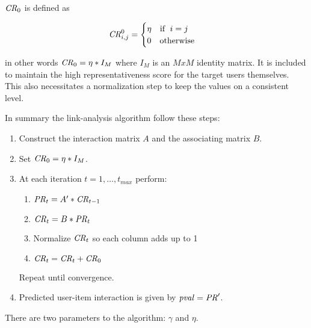$\mathit{CR}_0$ is defined as

\begin{equation}
    \mathit{CR}_{i, j}^0 = \begin{cases}
        \eta \quad \text{if } \; i = j \\
        0    \quad \text{otherwise}
    \end{cases}
\end{equation}

in other words $\mathit{CR}_0 = \eta * I_M$ where $I_M$ is an $M x M$ identity matrix.
It is included to maintain the high representativeness score for the target users themselves. This also necessitates a normalization step to keep the values on a consistent level.

In summary the link-analysis algorithm follow these steps:

\begin{enumerate}
    \item Construct the interaction matrix $A$ and the associating matrix $B$.

    \item Set $\mathit{CR}_0 = \eta * I_M$.
    \item At each iteration $t = 1, \ldots, t_{max}$ perform:

        \begin{enumerate}
            \item $\mathit{PR}_t = A' * \mathit{CR}_{t- 1}$
            \item $\mathit{CR}_t = B * \mathit{PR}_t$
            \item Normalize $\mathit{CR}_t$ so each column adds up to 1
            \item $\mathit{CR}_t = \mathit{CR}_t + \mathit{CR}_0$
        \end{enumerate}

        Repeat until convergence.

    \item Predicted user-item interaction is given by $\mathit{pval} = \mathit{PR}'$.

\end{enumerate}

There are two parameters to the algorithm: $\gamma$ and $\eta$.

